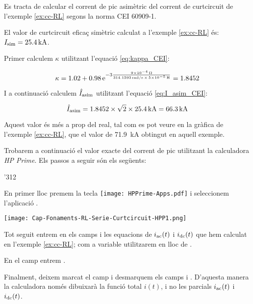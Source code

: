 \begin{exemple}\label{ex:corrent-pic}
    Es tracta de calcular el corrent de pic asimètric del corrent de curtcircuit de l'exemple \ref{ex:cc-RL} segons la norma CEI 60909-1.

    El valor de curtcircuit eficaç simètric calculat a l'exemple \vref{ex:cc-RL} és: $I_\mathrm{sim}= \SI{25,4}{kA}$.

    Primer calculem $\kappa$ utilitzant l'equació \eqref{eq:kappa_CEI}:

    \[
    \kappa = \num{1,02} + \num{0,98} \,\mathrm{e}^{-3\frac{\SI{9e-4}{\ohm}}{\SI{314,1593}{rad/s}\, \times\, \SI{5e-5}{H}}} = \num{1,8452}
    \]

    I a continuació calculem $\hat{I}_\mathrm{asim}$ utilitzant l'equació \eqref{eq:I_asim_CEI}:

    \[
    \hat{I}_\mathrm{asim} = \num{1,8452} \times \sqrt{2} \times \SI{25,4}{kA} = \SI{66,3}{kA}
    \]

    Aquest valor és més a prop del real, tal com es pot veure en la gràfica de l'exemple  \ref{ex:cc-RL}, que el valor de  \SI{71,9}{kA} obtingut en aquell exemple.

    Trobarem a continuació el valor exacte  del corrent de pic utilitzant la calculadora  \emph{HP Prime}.
     Els passos a seguir són els següents:

     \begin{dingautolist}{'312}

        \item En primer lloc premem la tecla \texttt{[image: HPPrime-Apps.pdf]} i seleccionem l'aplicació .

             \texttt{[image: Cap-Fonaments-RL-Serie-Curtcircuit-HPP1.png]}

        \item Tot seguit entrem en els camps  i  les equacions de $i_\mathrm{ac}(t)$ i $i_\mathrm{dc}(t)$ que hem calculat en l'exemple \vref{ex:cc-RL}; com a variable utilitzarem  en lloc de .

            En el camp  entrem .

            Finalment, deixem marcat el camp  i desmarquem els camps  i . D'aquesta manera la calculadora només dibuixarà la funció total $i(t)$, i no les parcials $i_\mathrm{ac}(t)$ i $i_\mathrm{dc}(t)$.



\end{dingautolist}
\end{exemple}
